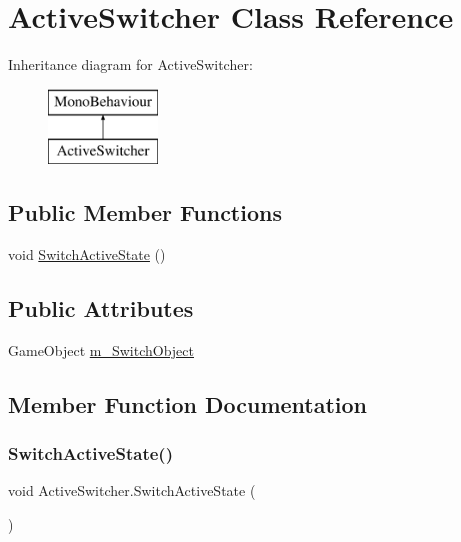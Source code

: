 \hypertarget{class_active_switcher}{}\section{Active\+Switcher Class Reference}
\label{class_active_switcher}
Inheritance diagram for Active\+Switcher\+:\begin{figure}[H]
\begin{center}
\leavevmode
\includegraphics[height=2.000000cm]{class_active_switcher}
\end{center}
\end{figure}
\subsection*{Public Member Functions}
\begin{DoxyCompactItemize}
\item 
void \mbox{\hyperlink{class_active_switcher_aed9f2ec3888516d96f7ab09cace536c9}{Switch\+Active\+State}} ()
\end{DoxyCompactItemize}
\subsection*{Public Attributes}
\begin{DoxyCompactItemize}
\item 
Game\+Object \mbox{\hyperlink{class_active_switcher_a8a51582a19c1bc16fc32f2b3bf86c8e1}{m\+\_\+\+Switch\+Object}}
\end{DoxyCompactItemize}


\subsection{Member Function Documentation}
\mbox{\label{class_active_switcher_aed9f2ec3888516d96f7ab09cace536c9}} 
\subsubsection{\texorpdfstring{SwitchActiveState()}{SwitchActiveState()}}
{\footnotesize\ttfamily void Active\+Switcher.\+Switch\+Active\+State (\begin{DoxyParamCaption}{ }\end{DoxyParamCaption})}



